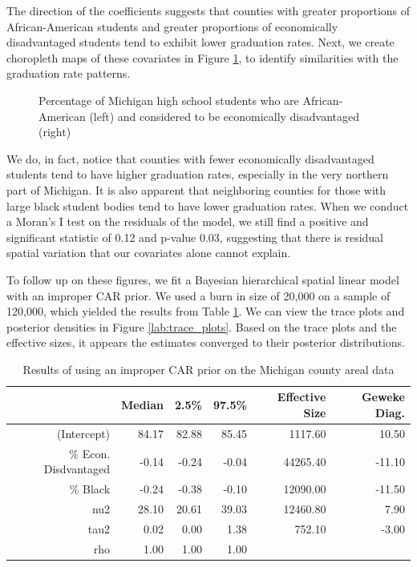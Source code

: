 \documentclass[12pt,letterpaper]{article}
\begin{document}
The direction of the coefficients suggests that counties with greater proportions of African-American students and greater proportions of economically disadvantaged students tend to exhibit lower graduation rates. Next, we create choropleth maps of these covariates in Figure \ref{lab:covar_plots}, to identify similarities with the graduation rate patterns.

\begin{figure}[h!]
\caption{Percentage of Michigan high school students who are African-American (left) and considered to be economically disadvantaged (right)}
\centering
\begin{minipage}{.5\textwidth}
  \centering
  \scalebox{.81}{
 \trimbox{1cm 2cm 0cm 0cm}{}
 }
\end{minipage}%
\begin{minipage}{.5\textwidth}
  \centering
  \scalebox{.81}{
 \trimbox{0cm 2cm -1cm 0cm}{}
 }
\end{minipage}

\label{lab:covar_plots}
\end{figure}

We do, in fact, notice that counties with fewer economically disadvantaged students tend to have higher graduation rates, especially in the very northern part of Michigan. It is also apparent that neighboring counties for those with large black student bodies tend to have lower graduation rates. When we conduct a Moran's I test on the residuals of the model, we still find a positive and significant statistic of 0.12 and p-value 0.03, suggesting that there is residual spatial variation that our covariates alone cannot explain. 


To follow up on these figures, we fit a Bayesian hierarchical spatial linear model with an improper CAR prior. We used a burn in size of 20,000 on a sample of 120,000, which yielded the results from Table \ref{tab:improper_car}. We can view the trace plots and posterior densities in Figure \ref{lab:trace_plots}. Based on the trace plots and the effective sizes, it appears the estimates  converged to their posterior distributions.


\begin{table}[h!]
\centering
  \caption{Results of using an improper CAR prior on the Michigan county areal data} 
  \label{tab:improper_car} 
\begin{tabular}{rrrrrr}
  \hline
 & Median & 2.5\% & 97.5\% & Effective Size & Geweke Diag. \\ 
  \hline
(Intercept) & 84.17 & 82.88 & 85.45 & 1117.60 & 10.50 \\ 
  \% Econ. Disdvantaged & -0.14 & -0.24 & -0.04 & 44265.40 & -11.10 \\ 
  \% Black & -0.24 & -0.38 & -0.10 & 12090.00 & -11.50 \\ 
  nu2 & 28.10 & 20.61 & 39.03 & 12460.80 & 7.90 \\ 
  tau2 & 0.02 & 0.00 & 1.38 & 752.10 & -3.00 \\ 
  rho & 1.00 & 1.00 & 1.00 &  &  \\ 
   \hline
\end{tabular}
\end{table}
\end{document}
